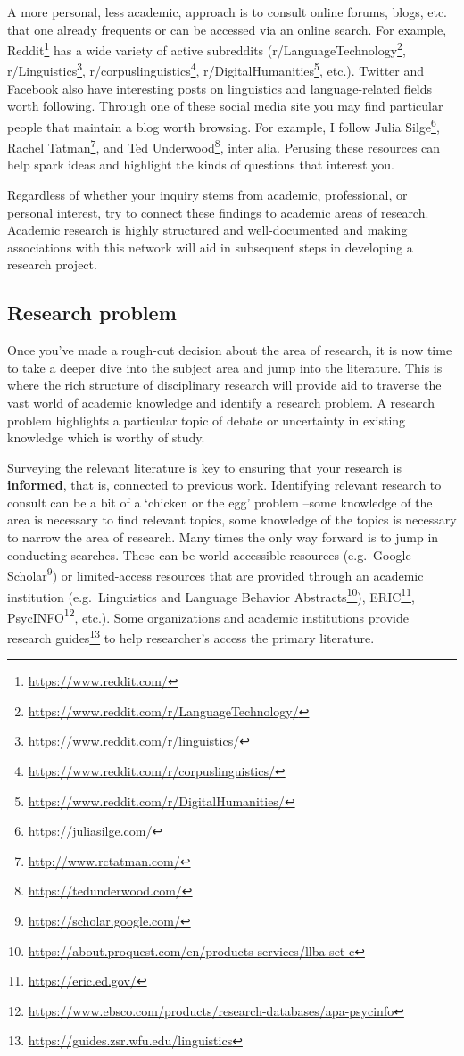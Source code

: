 \documentclass[
  letterpaper,
]{scrbook}
\DeclareRobustCommand{\href}[2]{#2\footnote{\url{#1}}}
\begin{document}
A more personal, less academic, approach is to consult online forums,
blogs, etc. that one already frequents or can be accessed via an online
search. For example, \href{https://www.reddit.com/}{Reddit} has a wide
variety of active subreddits
(\href{https://www.reddit.com/r/LanguageTechnology/}{r/LanguageTechnology},
\href{https://www.reddit.com/r/linguistics/}{r/Linguistics},
\href{https://www.reddit.com/r/corpuslinguistics/}{r/corpuslinguistics},
\href{https://www.reddit.com/r/DigitalHumanities/}{r/DigitalHumanities},
etc.). Twitter and Facebook also have interesting posts on linguistics
and language-related fields worth following. Through one of these social
media site you may find particular people that maintain a blog worth
browsing. For example, I follow \href{https://juliasilge.com/}{Julia
Silge}, \href{http://www.rctatman.com/}{Rachel Tatman}, and
\href{https://tedunderwood.com/}{Ted Underwood}, inter alia. Perusing
these resources can help spark ideas and highlight the kinds of
questions that interest you.

Regardless of whether your inquiry stems from academic, professional, or
personal interest, try to connect these findings to academic areas of
research. Academic research is highly structured and well-documented and
making associations with this network will aid in subsequent steps in
developing a research project.

\hypertarget{research-problem}{%
\subsection{Research problem}\label{research-problem}}

Once you've made a rough-cut decision about the area of research, it is
now time to take a deeper dive into the subject area and jump into the
literature. This is where the rich structure of disciplinary research
will provide aid to traverse the vast world of academic knowledge and
identify a research problem. A research problem highlights a particular
topic of debate or uncertainty in existing knowledge which is worthy of
study.

Surveying the relevant literature is key to ensuring that your research
is \textbf{informed}, that is, connected to previous work. Identifying
relevant research to consult can be a bit of a `chicken or the egg'
problem --some knowledge of the area is necessary to find relevant
topics, some knowledge of the topics is necessary to narrow the area of
research. Many times the only way forward is to jump in conducting
searches. These can be world-accessible resources
(e.g.~\href{https://scholar.google.com/}{Google Scholar}) or
limited-access resources that are provided through an academic
institution
(e.g.~\href{https://about.proquest.com/en/products-services/llba-set-c}{Linguistics
and Language Behavior Abstracts}), \href{https://eric.ed.gov/}{ERIC},
\href{https://www.ebsco.com/products/research-databases/apa-psycinfo}{PsycINFO},
etc.). Some organizations and academic institutions provide
\href{https://guides.zsr.wfu.edu/linguistics}{research guides} to help
researcher's access the primary literature.
\end{document}
